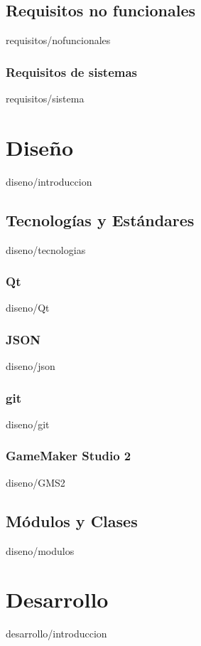 \documentclass[epsbased,copyright,final,printable,covers,extendedindex,firstnumbered,tfg,gnuplot]{tfgtfmthesisuam}
\begin{document}
	\section{Requisitos no funcionales\label{SEC:REQUISITOSNOFUNCIONALES}}{requisitos/nofuncionales}
		\begin{nonfunctional}
			\subsection{Requisitos de sistemas\label{SUBSEC:REQSISTEMA}}{requisitos/sistema}
		\end{nonfunctional}
	
\chapter{Diseño\label{CAP:DISENO}}{diseno/introduccion} %
	\section{Tecnologías y Estándares\label{SEC:TECNOLOGIAS}}{diseno/tecnologias}
		\subsection{Qt\label{SUBSEC:QT}}{diseno/Qt}
		\subsection{JSON\label{SUBSEC:JSON}}{diseno/json}
		\subsection{git\label{SUBSEC:GIT}}{diseno/git}
		\subsection{GameMaker Studio 2\label{SUBSEC:GMS2}}{diseno/GMS2}
	\section{Módulos y Clases\label{SEC:MODULOS}}{diseno/modulos}

\chapter{Desarrollo\label{CAP:DESARROLLO}}{desarrollo/introduccion}
\end{document}
